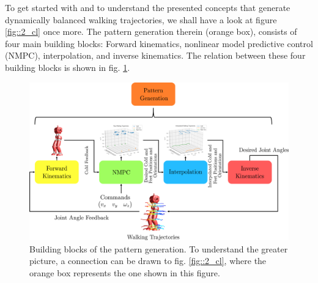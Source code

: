 \FloatBarrier
\label{sec::21_hw}
To get started with and to understand the presented concepts that generate dynamically balanced walking trajectories, we shall have a look at figure \ref{fig::2_cl} once more. The pattern generation therein (orange box), consists of four main building blocks: Forward kinematics, nonlinear model predictive control (NMPC), interpolation, and inverse kinematics. The relation between these four building blocks is shown in fig. \ref{fig::21_pg}.
\begin{figure}[h!]
	\centering
	\includegraphics[scale=.5]{chapters/06_implementing_an_autonomous_walking_pattern_generator/img/pattern_generation.png}
	\caption{Building blocks of the pattern generation. To understand the greater picture, a connection can be drawn to fig. \ref{fig::2_cl}, where the orange box represents the one shown in this figure.}
	\label{fig::21_pg}
\end{figure}
